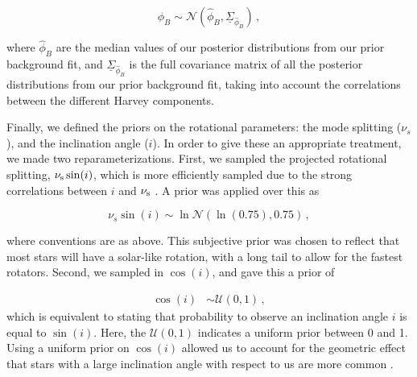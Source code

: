 \documentclass[12pt]{article}
\begin{document}
\begin{equation}
	\phi_{B}\sim\mathcal{N}(\hat{\phi}_{B},\underline{\Sigma}_{\hat{\phi}_{B}})\, ,
\end{equation}

\noindent where $\hat{\phi}_B$ are the median values of our posterior distributions from our prior background fit, and $\underline{\Sigma}_{\hat{\phi}_{B}}$ is the full covariance matrix of all the posterior distributions from our prior background fit, taking into account the correlations between the different Harvey components.

Finally, we defined the priors on the rotational parameters: the mode splitting ($\nu_s$), and the inclination angle ($i$). In order to give these an appropriate treatment, we made two reparameterizations. First, we sampled the projected rotational splitting, $\nu_{\rm{s}}\sin(i)$, which is more efficiently sampled due to the strong correlations between $i$ and $\nu_{\rm s}$ \cite{ballot+2006,ballot+2008a}. A prior was applied over this as

\begin{equation}
	\nu_s\sin(i) \sim \ln\mathcal{N}(\ln(0.75), 0.75)\, ,
\end{equation}

\noindent where conventions are as above. This subjective prior was chosen to reflect that most stars will have a solar-like rotation, with a long tail to allow for the fastest rotators. Second, we sampled in $\cos(i)$, and gave this a prior of

\begin{equation}
	\begin{split}
		\cos(i) &\sim \mathcal{U}(0, 1)\, ,
	\end{split}
\end{equation}
which is equivalent to stating that probability to observe an inclination angle $i$ is equal to $\sin(i)$. Here, the $\mathcal{U}(0,1)$ indicates a uniform prior between 0 and 1. Using a uniform prior on $\cos(i)$ allowed us to account for the geometric effect that stars with a large inclination angle with respect to us are more common \cite{chaplin+basu2017}.
\end{document}
